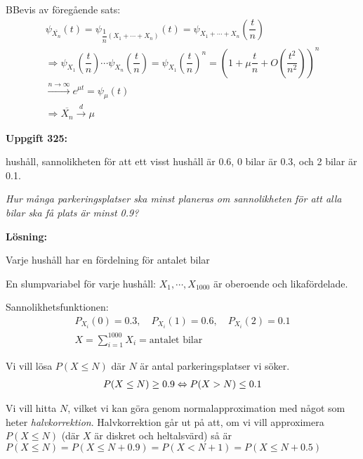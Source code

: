 \par\bigskip
\begin{prf}
  BBevis av föregående sats:
  \begin{equation*}
    \begin{gathered}
      \psi_{\overline{X_n}}(t) = \psi_{\dfrac{1}{n}(X_1+\cdots+X_n)}(t) = \psi_{X_1+\cdots+X_n}(\dfrac{t}{n})\\
      \Rightarrow\psi_{X_1}(\dfrac{t}{n})\cdots\psi_{X_n}(\dfrac{t}{n}) = \psi_{X_1}(\dfrac{t}{n})^n = (1+\mu\dfrac{t}{n}+O(\dfrac{t^2}{n^2}))^n\\
      \stackrel{n\to\infty}{\rightarrow}e^{\mu t} = \psi_{\mu}(t)\\
      \Rightarrow\overline{X_n}\stackrel{d}{\rightarrow}\mu
    \end{gathered}
  \end{equation*}
\end{prf}
\newpage
\noindent\textbf{Uppgift 325:}\par
{} hushåll, sannolikheten för att ett visst hushåll är 0.6, 0 bilar är 0.3, och 2 bilar är 0.1.\par
\noindent\textit{Hur många parkeringsplatser ska minst planeras om sannolikheten för att alla bilar ska få plats är minst 0.9?}
\par\bigskip
\noindent\textbf{Lösning:}\par
\noindent Varje hushåll har en fördelning för antalet bilar\par
\noindent En slumpvariabel för varje hushåll: $X_1,\cdots,X_{1000}$  är oberoende och likafördelade.\par
\noindent Sannolikhetsfunktionen:
\begin{equation*}
  \begin{gathered}
    P_{X_i}(0) = 0.3,\quad P_{X_i}(1) = 0.6,\quad P_{X_i}(2) = 0.1\\
    X = \sum_{i=1}^{1000}X_i = \text{antalet bilar}
  \end{gathered}
\end{equation*}\par
\noindent Vi vill lösa $P(X\leq N)$ där $N$ är antal parkeringsplatser vi söker.
\begin{equation*}
  \begin{gathered}
    P(X\leq N)\geq0.9\Leftrightarrow P(X>N)\leq0.1
  \end{gathered}
\end{equation*}\par
\noindent Vi vill hitta $N$, vilket vi kan göra genom normalapproximation med något som heter \textit{halvkorrektion}. Halvkorrektion går ut på att, om vi vill approximera $P(X\leq N)$ (där $X$ är diskret och heltalsvärd) så är $P(X\leq N) = P(X\leq N+0.9) = P(X<N+1) = P(X\leq N+0.5)$\par
